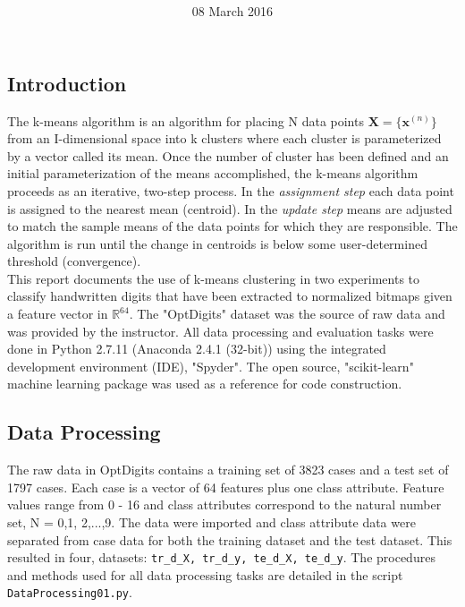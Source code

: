 \documentclass[12pt]{article}
\title{
\vspace{2in}
\textmd{\textbf{\hmwkTitle}}\\
\textit{\normalsize \hmwkClass}
\vspace{3in}
}
\author{\textbf{\hmwkAuthorName}}
\date{08 March 2016} %
\begin{document}
\maketitle
\thispagestyle{empty}
\clearpage\maketitle

\subsection{Introduction}
The k-means algorithm is an algorithm for placing N data points $\mathbf{X} = \{ \mathbf{x}^{(n)}\} $ from an I-dimensional space into k clusters where each cluster is parameterized by a vector called its mean. Once the number of cluster has been defined and an initial parameterization of the means accomplished, the k-means algorithm proceeds as an iterative, two-step process. In the \textit{assignment step} each data point is assigned to the nearest mean (centroid). In the \textit{update step} means are adjusted to match the sample means of the data points for which they are responsible. The algorithm is run until the change in centroids is below some user-determined threshold (convergence).\\ 

This report documents the use of k-means clustering in two experiments to classify handwritten digits that have been extracted to normalized bitmaps given a feature vector in $ \mathbb{R}^{64}$. The "OptDigits" dataset was the source of raw data and was provided by the instructor. All data processing and evaluation tasks were done in Python 2.7.11 (Anaconda 2.4.1 (32-bit)) using the integrated development environment (IDE), "Spyder". The open source, "scikit-learn" machine learning package was used as a reference for code construction.\\

\subsection{Data Processing}
The raw data in OptDigits contains a training set of 3823 cases and a test set of 1797 cases. Each case is a vector of 64 features plus one class attribute. Feature values range from 0 - 16 and class attributes correspond to the natural number set, N = {0,1, 2,...,9}.  The data were imported and class attribute data were separated from case data for both the training dataset and the test dataset. This resulted in four, datasets: \verb!tr_d_X, tr_d_y, te_d_X, te_d_y!. The procedures and methods used for all data processing tasks are detailed in the script \verb!DataProcessing01.py!.
\end{document}
